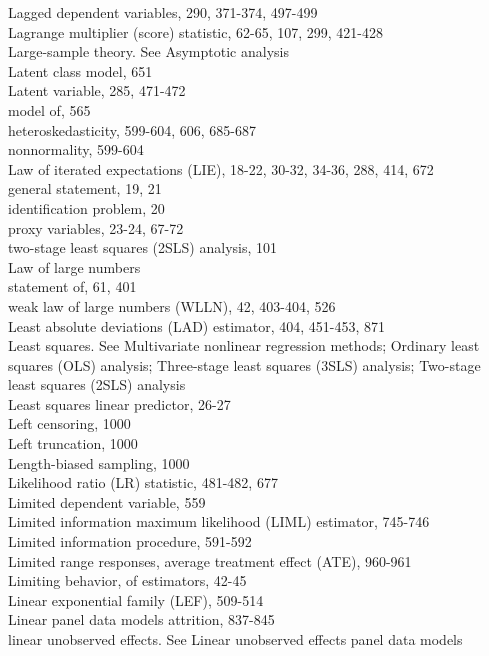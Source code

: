 \documentclass[10pt]{article}
\begin{document}
Lagged dependent variables, 290, 371-374, 497-499\\
Lagrange multiplier (score) statistic, 62-65, 107, 299, 421-428\\
Large-sample theory. See Asymptotic analysis\\
Latent class model, 651\\
Latent variable, 285, 471-472\\
model of, 565\\
heteroskedasticity, 599-604, 606, 685-687\\
nonnormality, 599-604\\
Law of iterated expectations (LIE), 18-22, 30-32, 34-36, 288, 414, 672\\
general statement, 19, 21\\
identification problem, 20\\
proxy variables, 23-24, 67-72\\
two-stage least squares (2SLS) analysis, 101\\
Law of large numbers\\
statement of, 61, 401\\
weak law of large numbers (WLLN), 42, 403-404, 526\\
Least absolute deviations (LAD) estimator, 404, 451-453, 871\\
Least squares. See Multivariate nonlinear regression methods; Ordinary least squares (OLS) analysis; Three-stage least squares (3SLS) analysis; Two-stage least squares (2SLS) analysis\\
Least squares linear predictor, 26-27\\
Left censoring, 1000\\
Left truncation, 1000\\
Length-biased sampling, 1000\\
Likelihood ratio (LR) statistic, 481-482, 677\\
Limited dependent variable, 559\\
Limited information maximum likelihood (LIML) estimator, 745-746\\
Limited information procedure, 591-592\\
Limited range responses, average treatment effect (ATE), 960-961\\
Limiting behavior, of estimators, 42-45\\
Linear exponential family (LEF), 509-514\\
Linear panel data models attrition, 837-845\\
linear unobserved effects. See Linear unobserved effects panel data models\\
\end{document}
